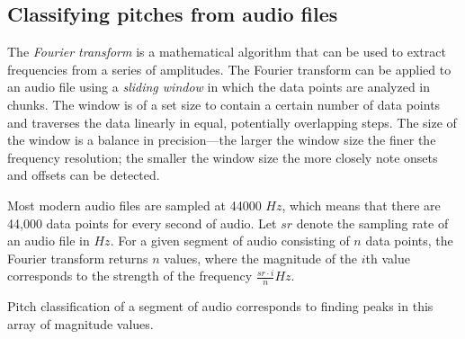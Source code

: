 \subsection{Classifying pitches from audio files}

The \textit{Fourier transform} is a mathematical algorithm that can be used to extract frequencies from a series of amplitudes. The Fourier transform can be applied to an audio file using a \textit{sliding window} in which the data points are analyzed in chunks. The window is of a set size to contain a certain number of data points and traverses the data linearly in equal, potentially overlapping steps. The size of the window is a balance in precision---the larger the window size the finer the frequency resolution; the smaller the window size the more closely note onsets and offsets can be detected.

Most modern audio files are sampled at 44000 $Hz$, which means that there are 44,000 data points for every second of audio. Let $sr$ denote the sampling rate of an audio file in $Hz$. For a given segment of audio consisting of $n$ data points, the Fourier transform returns $n$ values, where the magnitude of the $i$th value corresponds to the strength of the frequency $\frac{sr \cdot i}{n}Hz$.

Pitch classification of a segment of audio corresponds to finding peaks in this array of magnitude values.

